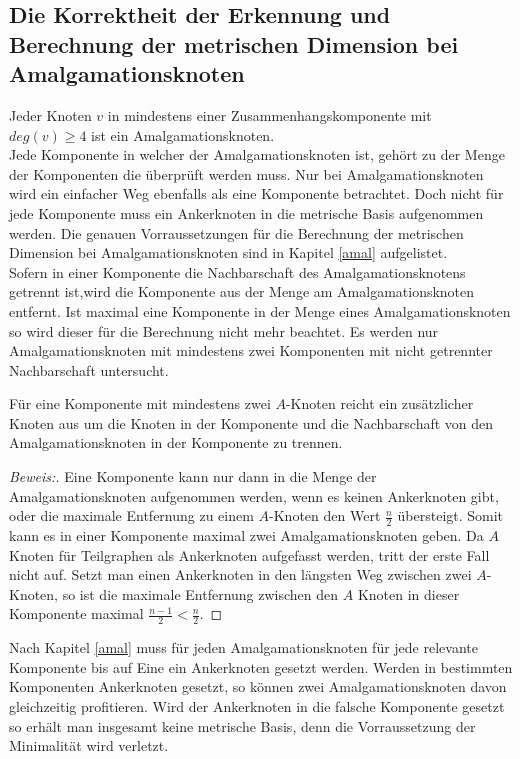 \subsection{Die Korrektheit der Erkennung und Berechnung der metrischen Dimension bei Amalgamationsknoten}
\label{korramal}
Jeder Knoten $v$ in mindestens einer Zusammenhangskomponente mit $deg(v)\geq 4$ ist ein Amalgamationsknoten.\\
Jede Komponente in welcher der Amalgamationsknoten ist, gehört zu der Menge der Komponenten die überprüft werden muss. Nur bei Amalgamationsknoten wird ein einfacher Weg ebenfalls als eine Komponente betrachtet. Doch nicht für jede Komponente muss ein Ankerknoten in die metrische Basis aufgenommen werden.
Die genauen Vorraussetzungen für die Berechnung der metrischen Dimension bei Amalgamationsknoten sind in Kapitel \ref{amal} aufgelistet.\\Sofern in einer Komponente die Nachbarschaft des Amalgamationsknotens getrennt ist,wird die Komponente aus der Menge am Amalgamationsknoten entfernt. Ist maximal eine Komponente in der Menge eines Amalgamationsknoten so wird dieser für die Berechnung nicht mehr beachtet. Es werden nur Amalgamationsknoten mit mindestens zwei Komponenten mit nicht getrennter Nachbarschaft untersucht.
\begin{lem}
Für eine Komponente mit mindestens zwei $A$-Knoten reicht ein zusätzlicher Knoten aus um die Knoten in der Komponente und die Nachbarschaft von den Amalgamationsknoten in der Komponente zu trennen.
\end{lem}
\begin{proof}[Beweis:]
Eine Komponente kann nur dann in die Menge der Amalgamationsknoten aufgenommen werden, wenn es keinen Ankerknoten gibt, oder die maximale Entfernung zu einem $A$-Knoten den Wert $\frac{n}{2}$ übersteigt. Somit kann es in einer Komponente maximal zwei Amalgamationsknoten geben. Da $A$ Knoten für Teilgraphen als Ankerknoten aufgefasst werden, tritt der erste Fall nicht auf. Setzt man einen Ankerknoten in den längsten Weg zwischen zwei $A$-Knoten, so ist die maximale Entfernung zwischen den $A$ Knoten in dieser Komponente maximal $\frac{n-1}{2} < \frac{n}{2}$.
\end{proof}
Nach Kapitel \ref{amal} muss für jeden Amalgamationsknoten für jede relevante Komponente bis auf Eine ein Ankerknoten gesetzt werden. Werden in bestimmten Komponenten Ankerknoten gesetzt, so können zwei Amalgamationsknoten davon gleichzeitig profitieren. Wird der Ankerknoten in die falsche Komponente gesetzt so erhält man insgesamt keine metrische Basis, denn die Vorraussetzung der Minimalität wird verletzt.


